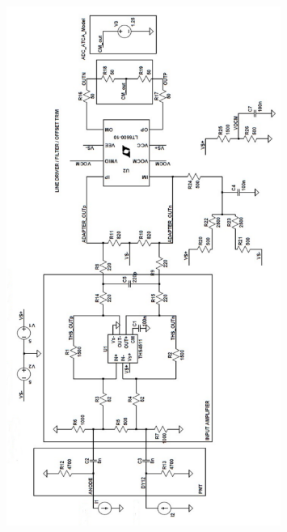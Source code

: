 \documentclass[a4paper,11pt]{report}
\begin{document}
\begin{figure}
  \begin{center}
    \includegraphics[width=0.8\textwidth]{./figures/FEE_full.pdf}
    \caption{}
    \label{fig:fig_FEE_full}
  \end{center}
\end{figure}
\end{document}
